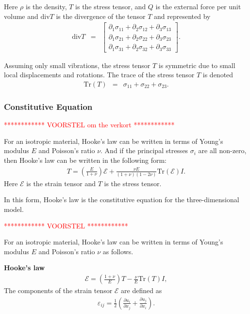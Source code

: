 		Here $\rho$ is the density, $T$ is the stress tensor, and $Q$ is the external 
		force per unit volume and $\textrm{div}T$ is the divergence of the tensor $T$ and represented by
		\begin{eqnarray}
			\textrm{div}  T & = &
			\begin{bmatrix}
				\partial_1 \sigma_{11} + \partial_2 \sigma_{12} + \partial_3 \sigma_{13} \\
				\partial_1 \sigma_{21} + \partial_2 \sigma_{22} + \partial_3 \sigma_{23} \\
				\partial_1 \sigma_{31} + \partial_2 \sigma_{32} + \partial_3 \sigma_{33}
			\end{bmatrix}. \label{eq:3D_Model:divT}
		\end{eqnarray}

		Assuming only small vibrations, the stress tensor $T$ is symmetric due to small
		local displacements and rotations. The trace of the stress tensor $T$ is denoted
		\begin{eqnarray}
			\textrm{Tr}(T) & = & \sigma_{11} + \sigma_{22} + \sigma_{23}. \label{eq:stress_tensor_t}
		\end{eqnarray}

		\subsubsection*{Constitutive Equation}
			\textcolor{red}{************ VOORSTEL om the verkort ************}

			For an isotropic material, Hooke's law can be written in terms of Young's modulus $E$ and Poisson's ratio $\nu$. And if the principal stresses $\sigma_i$ are all non-zero, then Hooke's law can be written in the following form:
			\begin{eqnarray}
				T = \left( \frac{E}{1+\nu} \right)\mathcal{E} + \frac{\nu E}{(1+\nu)(1-2\nu)}\textrm{Tr}(\mathcal{E})I \label{eq:3D_Model:CE}.
			\end{eqnarray} Here $\mathcal{E}$ is the strain tensor and $T$ is the stress tensor.

			In this form, Hooke's law is the constitutive equation for the three-dimensional model.

			\textcolor{red}{************ VOORSTEL ************}

			For an isotropic material, Hooke's law can be written in terms of Young's modulus $E$ and Poisson's ratio $\nu$ as follows.

			\textbf{Hooke's law}
			\begin{eqnarray}
				\mathcal{E} = \left( \frac{1+\nu}{E} \right)T - \frac{\nu}{E}\textrm{Tr}(T)I,  \label{eq:3D_Model:HL}
			\end{eqnarray} The components of the strain tensor $\mathcal{E}$ are defined as
			\begin{eqnarray}
				\varepsilon_{ij} = \frac{1}{2}\left( \frac{\partial u_i}{\partial x_j} + \frac{\partial u_j}{\partial x_i} \right). \label{eq:3D_Model:Strain}
			\end{eqnarray}\label{sym:varepsilonij}

